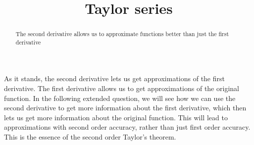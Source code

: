 \documentclass{ximera}
\title{Taylor series}
\begin{document}
\begin{abstract}
  The second derivative allows us to approximate functions better than just the first derivative
\end{abstract}

As it stands, the second derivative lets us get approximations of the first derivative.  The first derivative allows us to get approximations of the original function.
In the following extended question, we will see how we can use the second derivative to get more information about the first derivative, which then lets us get more
information about the original function.  This will lead to approximations with second order accuracy, rather than just first order accuracy.  This is the essence of 
the second order Taylor's theorem.
\end{document}
